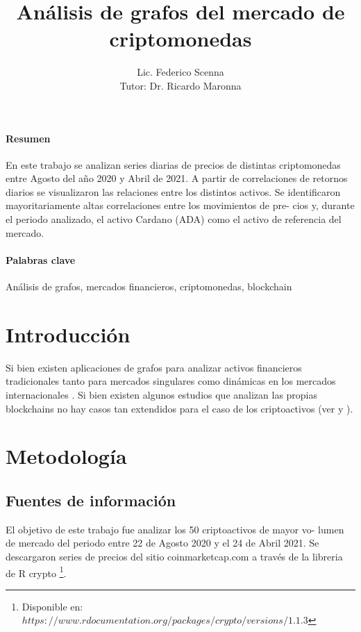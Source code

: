 \documentclass[runningheads,a4paper,10pt]{etc/llncs}
\title{Análisis de grafos del mercado de criptomonedas}
\author{Lic. Federico Scenna\\ [1cm] {\small Tutor: Dr. Ricardo Maronna}}
\institute{ Maestría en Exploración de Datos y Descubrimiento del Conocimiento \\
Facultad de Ciencias Exactas y Naturales\\ Universidad de Buenos Aires\\
\mailsa
}
\let\stdsection\section
\renewcommand\section{\newpage\stdsection}
\begin{document}
\let\oldaddcontentsline\addcontentsline
\def\addcontentsline#1#2#3{}
\maketitle
\def\addcontentsline#1#2#3{\oldaddcontentsline{#1}{#2}{#3}}

\newpage

\paragraph{Resumen} En este trabajo se analizan series diarias de precios de distintas criptomonedas entre Agosto del año 2020 y Abril de 2021. A partir de correlaciones
de retornos diarios se visualizaron las relaciones entre los distintos activos. Se
identificaron mayoritariamente altas correlaciones entre los movimientos de pre-
cios y, durante el periodo analizado, el activo Cardano (ADA) como el activo de
referencia del mercado.

\paragraph{Palabras clave} Análisis de grafos, mercados financieros, criptomonedas, blockchain

\tableofcontents

\newpage
\section{Introducción}

Si bien existen aplicaciones de grafos para analizar activos financieros tradicionales tanto para mercados singulares \cite{grekmarket} como dinámicas en los mercados internacionales \cite{towards}. Si bien existen algunos estudios que analizan las propias blockchains \cite{btc-btccash} no hay casos tan extendidos para el caso de los criptoactivos (ver \cite{cryptocurrency_rjc} y \cite{cryptonetwork}). 

\section{Metodología}

\subsection{Fuentes de información}
El objetivo de este trabajo fue analizar los 50 criptoactivos de mayor vo-
lumen de mercado del periodo entre 22 de Agosto 2020 y el 24 de Abril 2021. Se descargaron
series de precios del sitio coinmarketcap.com a través de la libreria de R crypto \footnote{Disponible en: $https://www.rdocumentation.org/packages/crypto/versions/1.1.3$}.
\end{document}
